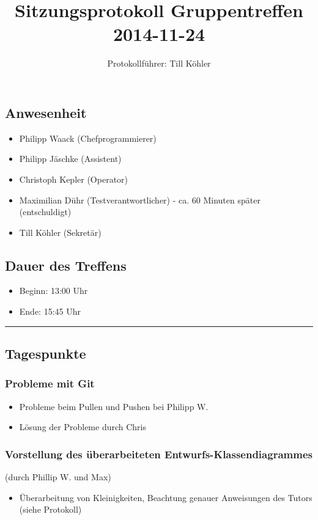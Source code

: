 \documentclass[12pt,a4paper]{article}
\author{Protokollführer: Till Köhler}
\title{Sitzungsprotokoll Gruppentreffen 2014-11-24}
\date{}
\begin{document}
\maketitle

\subsection*{Anwesenheit}
\medskip
\begin{itemize}
\item Philipp Waack (Chefprogrammierer)
\item Philipp Jäschke (Assistent)
\item Christoph Kepler (Operator)
\item Maximilian Dühr (Testverantwortlicher) - ca. 60 Minuten später (entschuldigt)
\item Till Köhler (Sekretär)
\end{itemize}

\subsection*{Dauer des Treffens}
\medskip
\begin{itemize}
\item Beginn: 13:00 Uhr
\item Ende: 15:45 Uhr
\end{itemize}

\noindent\rule{\textwidth}{1pt}

\subsection*{Tagespunkte}
\medskip

\subsubsection*{Probleme mit Git}
\begin{itemize}
\item Probleme beim Pullen und Pushen bei Philipp W.
\item Lösung der Probleme durch Chris
\end{itemize}

\subsubsection*{Vorstellung des überarbeiteten Entwurfs-Klassendiagrammes}
(durch Phillip W. und Max)
\begin{itemize}
\item Überarbeitung von Kleinigkeiten, Beachtung genauer Anweisungen des Tutors (siehe Protokoll)
\end{itemize}
\end{document}
